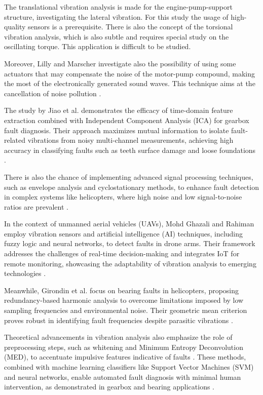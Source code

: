 {{The translational vibration analysis is made for the engine-pump-support structure, investigating the lateral vibration.  For this study the usage of high-quality sensors is a prerequisite. There is also the concept of the torsional vibration analysis, which is also subtle and requires special study on the oscillating torque. This application is difficult to be studied.

Moreover, Lilly and Marscher investigate also the possibility of using some actuators that may compensate the noise of the motor-pump compound, making the most of the electronically generated sound waves. This technique aims at the cancellation of noise pollution \cite{Lilly2008}.

The study by Jiao et al. demonstrates the efficacy of time-domain feature extraction combined with Independent Component Analysis (ICA) for gearbox fault diagnosis. Their approach maximizes mutual information to isolate fault-related vibrations from noisy multi-channel measurements, achieving high accuracy in classifying faults such as teeth surface damage and loose foundations \cite{Jiao2017}. 

There is also the chance of implementing advanced signal processing techniques, such as envelope analysis and cyclostationary methods, to enhance fault detection in complex systems like helicopters, where high noise and low signal-to-noise ratios are prevalent \cite{Girondin2012}.

In the context of unmanned aerial vehicles (UAVs), Mohd Ghazali and Rahiman employ vibration sensors and artificial intelligence (AI) techniques, including fuzzy logic and neural networks, to detect faults in drone arms. Their framework addresses the challenges of real-time decision-making and integrates IoT for remote monitoring, showcasing the adaptability of vibration analysis to emerging technologies \cite{Ghazali2022}. 

Meanwhile, Girondin et al. focus on bearing faults in helicopters, proposing redundancy-based harmonic analysis to overcome limitations imposed by low sampling frequencies and environmental noise. Their geometric mean criterion proves robust in identifying fault frequencies despite parasitic vibrations \cite{Girondin2012}.

Theoretical advancements in vibration analysis also emphasize the role of preprocessing steps, such as whitening and Minimum Entropy Deconvolution (MED), to accentuate impulsive features indicative of faults \cite{Girondin2012}. These methods, combined with machine learning classifiers like Support Vector Machines (SVM) and neural networks, enable automated fault diagnosis with minimal human intervention, as demonstrated in gearbox and bearing applications \cite{Jiao2017, Ghazali2022}.

}}
